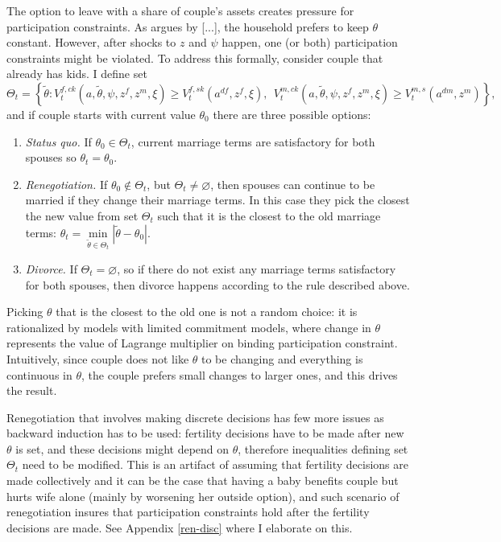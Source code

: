 The option to leave with a share of couple's assets creates pressure for participation constraints. As argues by [...], the household prefers to keep $\theta$ constant. However, after shocks to $z$ and $\psi$ happen, one (or both) participation constraints might be violated. To address this formally, consider couple that already has kids. I define set
\begin{equation}\Theta_t = \left\{ \tilde\theta : V^{f,ck}_t(a,\tilde\theta,\psi,z^f,z^m,\xi) \geq V_t^{f,sk}(a^{df},z^f,\xi) , \ \ V_t^{m,ck}(a,\tilde\theta,\psi,z^f,z^m,\xi)\geq V_t^{m,s}(a^{dm},z^m) \right\} \label{reneg-with-kids}
,\end{equation}
and if couple starts with current value $\theta_{0}$ there are three possible options:
\begin{enumerate}
\item \textit{Status quo.} If $\theta_0 \in \Theta_t$, current marriage terms are satisfactory for both spouses so $\theta_t = \theta_{0}$.
\item \textit{Renegotiation.} If $\theta_0 \not\in \Theta_t$, but $\Theta_t \neq \varnothing$, then spouses can continue to be married if they change their marriage terms. In this case they pick the closest the new value from set $\Theta_t$ such that it is the closest to the old marriage terms: $\theta_t = \min\limits_{\tilde\theta\in\Theta_t} |\tilde\theta - \theta_0|$. 
\item \textit{Divorce.}  If $\Theta_t = \varnothing$, so if there do not exist any marriage terms satisfactory for both spouses, then divorce happens according to the rule described above.
\end{enumerate}
Picking $\theta$ that is the closest to the old one is not a random choice: it is rationalized by models with limited commitment models, where change in $\theta$ represents the value of Lagrange multiplier on binding participation constraint. Intuitively, since couple does not like $\theta$ to be changing and everything is continuous in $\theta$, the couple prefers small changes to larger ones, and this drives the result.

Renegotiation that involves making discrete decisions has few more issues as backward induction has to be used: fertility decisions have to be made after new $\theta$ is set, and these decisions might depend on $\theta$, therefore inequalities defining set $\Theta_t$ need to be modified. This is an artifact of assuming that fertility decisions are made collectively and it can be the case that having a baby benefits couple but hurts wife alone (mainly by worsening her outside option), and such scenario of renegotiation insures that participation constraints hold after the fertility decisions are made. See Appendix \ref{ren-disc} where I elaborate on this.



